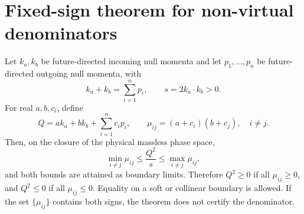 \section{Fixed-sign theorem for non-virtual denominators}
\label{app:fixed-sign}

Let $k_a,k_b$ be future-directed incoming null momenta and let
$p_1,\ldots,p_n$ be future-directed outgoing null momenta, with
\begin{equation}
 k_a+k_b=\sum_{i=1}^{n}p_i,
 \qquad s=2k_a\cdot k_b>0.
 \label{eq:sign-theorem-kinematics}
\end{equation}
For real $a,b,c_i$, define
\begin{equation}
 Q=ak_a+bk_b+\sum_{i=1}^{n}c_ip_i,
 \qquad
 \mu_{ij}=(a+c_i)(b+c_j),
 \quad i\ne j.
 \label{eq:sign-theorem-Q}
\end{equation}
Then, on the closure of the physical massless phase space,
\begin{equation}
 \min_{i\ne j}\mu_{ij}
 \leq\frac{Q^2}{s}\leq
 \max_{i\ne j}\mu_{ij},
 \label{eq:fixed-sign-bound}
\end{equation}
and both bounds are attained as boundary limits.  Therefore $Q^2\geq0$ if
all $\mu_{ij}\geq0$, and $Q^2\leq0$ if all
$\mu_{ij}\leq0$.  Equality on a soft or collinear boundary is allowed.  If
the set $\{\mu_{ij}\}$ contains both signs, the theorem does not certify the
denominator.

